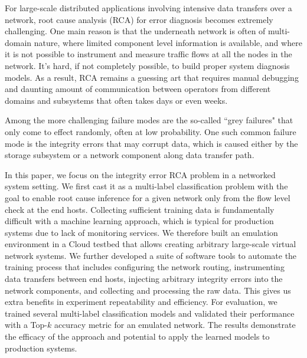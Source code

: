 For large-scale distributed applications involving intensive data transfers over a network, root cause analysis (RCA) for error diagnosis becomes extremely challenging. One main reason is that the underneath network is often of multi-domain nature, where limited component level information is available, and where it is not possible to instrument and measure traffic flows at all the nodes in the network. It's hard, if not completely possible, to build proper system diagnosis models. As a result, RCA remains a guessing art that requires manual debugging and daunting amount of communication between operators from different domains and subsystems that often takes days or even weeks.  

Among the more challenging failure modes are the so-called ``grey failures" that only come to effect randomly, often at low probability. One such common failure mode is the integrity errors that may corrupt data, which is caused either by the storage subsystem or a network component along data transfer path. 

In this paper, we focus on the integrity error RCA problem in a networked system setting. We first cast it as a multi-label classification problem with the goal to enable root cause inference for a given network only from the flow level check at the end hosts. Collecting sufficient training data is fundamentally difficult with a machine learning approach, which is typical for production systems due to lack of monitoring services. We therefore built an emulation environment in a Cloud testbed that allows creating arbitrary large-scale virtual network systems. We further developed a suite of software tools to automate the training process that includes configuring the network routing, instrumenting data transfers between end hosts, injecting arbitrary integrity errors into the network components, and collecting and processing the raw data. This gives us extra benefits in experiment repeatability and efficiency. For evaluation, we trained several multi-label classification models and validated their performance with a Top-$k$ accuracy metric for an emulated network. The results demonstrate the efficacy of the approach and potential to apply the learned models to production systems.  
